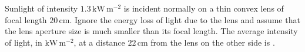 
\item Sunlight of intensity \( 1.3 \, \text{kW} \, \text{m}^{-2} \) is incident normally on a thin convex lens of focal length \( 20 \, \text{cm} \). Ignore the energy loss of light due to the lens and assume that the lens aperture size is much smaller than its focal length. The average intensity of light, in \( \text{kW} \, \text{m}^{-2} \), at a distance \( 22 \, \text{cm} \) from the lens on the other side is \underline{\hspace{3cm}}.
